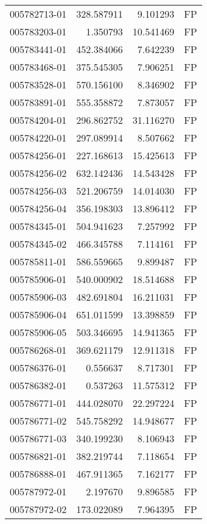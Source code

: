 \begin{tabular}{lrrl}
005782713-01 &  328.587911 &     9.101293 &   FP \\
005783203-01 &    1.350793 &    10.541469 &   FP \\
005783441-01 &  452.384066 &     7.642239 &   FP \\
005783468-01 &  375.545305 &     7.906251 &   FP \\
005783528-01 &  570.156100 &     8.346902 &   FP \\
005783891-01 &  555.358872 &     7.873057 &   FP \\
005784204-01 &  296.862752 &    31.116270 &   FP \\
005784220-01 &  297.089914 &     8.507662 &   FP \\
005784256-01 &  227.168613 &    15.425613 &   FP \\
005784256-02 &  632.142436 &    14.543428 &   FP \\
005784256-03 &  521.206759 &    14.014030 &   FP \\
005784256-04 &  356.198303 &    13.896412 &   FP \\
005784345-01 &  504.941623 &     7.257992 &   FP \\
005784345-02 &  466.345788 &     7.114161 &   FP \\
005785811-01 &  586.559665 &     9.899487 &   FP \\
005785906-01 &  540.000902 &    18.514688 &   FP \\
005785906-03 &  482.691804 &    16.211031 &   FP \\
005785906-04 &  651.011599 &    13.398859 &   FP \\
005785906-05 &  503.346695 &    14.941365 &   FP \\
005786268-01 &  369.621179 &    12.911318 &   FP \\
005786376-01 &    0.556637 &     8.717301 &   FP \\
005786382-01 &    0.537263 &    11.575312 &   FP \\
005786771-01 &  444.028070 &    22.297224 &   FP \\
005786771-02 &  545.758292 &    14.948677 &   FP \\
005786771-03 &  340.199230 &     8.106943 &   FP \\
005786821-01 &  382.219744 &     7.118654 &   FP \\
005786888-01 &  467.911365 &     7.162177 &   FP \\
005787972-01 &    2.197670 &     9.896585 &   FP \\
005787972-02 &  173.022089 &     7.964395 &   FP \\

\end{tabular}
